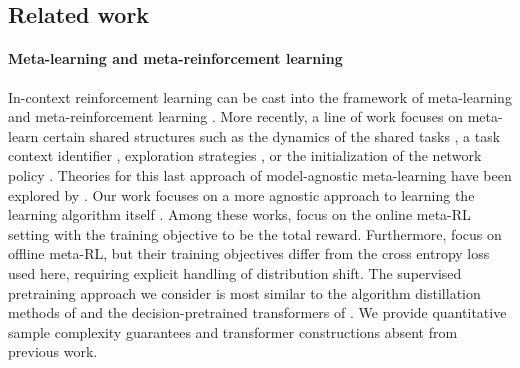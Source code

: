 \documentclass[10pt]{article}
\newcommand{\<}{\left\langle}
\renewcommand{\>}{\right\rangle}
\begin{document}
\subsection{Related work}\label{sec:related-work}
\paragraph{Meta-learning and meta-reinforcement learning} In-context reinforcement learning can be cast into the framework of meta-learning and meta-reinforcement learning \citep{schmidhuber1987evolutionary, schmidhuber1992learning, bengio1990learning, naik1992meta, ishii2002control, schaul2010metalearning, thrun2012learning}. More recently, a line of work focuses on meta-learn certain shared structures such as the dynamics of the shared tasks \citep{fu2016one, nagabandi2018learning}, a task context identifier \citep{rakelly2019efficient, humplik2019meta, zintgraf2019varibad}, exploration strategies \citep{gupta2018meta}, or the initialization of the network policy \citep{finn2017model, hochreiter2001learning, nichol2018first, rothfuss2018promp}. Theories for this last approach of model-agnostic meta-learning have been explored by \cite{wang2020global}.
Our work focuses on a more agnostic approach to learning the learning algorithm itself \citep{wang2016learning, duan2016rl, dorfman2021offline, mitchell2021offline, li2020focal, pong2022offline, laskin2022context, lee2023supervised}. Among these works, \cite{wang2016learning, duan2016rl} focus on the online meta-RL setting with the training objective to be the total reward. Furthermore, \cite{dorfman2021offline, mitchell2021offline, li2020focal, pong2022offline} focus on offline meta-RL, but their training objectives differ from the cross entropy loss used here, requiring explicit handling of distribution shift. The supervised pretraining approach we consider is most similar to the algorithm distillation methods of \cite{laskin2022context} and the decision-pretrained transformers of \cite{lee2023supervised}. We provide quantitative sample complexity guarantees and transformer constructions absent from previous work.
\end{document}
